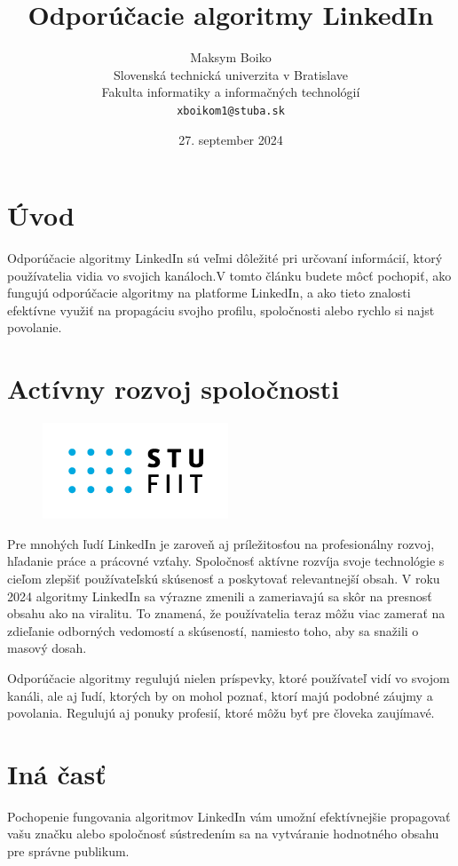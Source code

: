 \documentclass[twoside,slovak,a4paper]{coursepaper}
\title{Odporúčacie algoritmy LinkedIn\centering}
\author{Maksym Boiko\\[2pt]
{ Slovenská technická univerzita v Bratislave}\\
{ Fakulta informatiky a informačných technológií}\\
{ \texttt{xboikom1@stuba.sk}}
}
\date{\small 27. september 2024}
\begin{document}
\maketitle

\section{Úvod}
Odporúčacie algoritmy LinkedIn sú veľmi dôležité pri určovaní informácií, ktorý používatelia vidia vo svojich kanáloch.V tomto článku budete môcť pochopiť, ako fungujú odporúčacie algoritmy na platforme LinkedIn, a ako tieto znalosti efektívne využiť na propagáciu svojho profilu, spoločnosti alebo rychlo si najst povolanie.

\section{Actívny rozvoj spoločnosti} \label{rozvoj spoločnosti}

\begin{figure}
	\includegraphics{STU-FIIT-zfv.png}
\end{figure}

Pre mnohých ľudí LinkedIn je zaroveň aj príležitosťou na profesionálny rozvoj, hľadanie práce a prácovné vzťahy.
Spoločnosť aktívne rozvíja svoje technológie s cieľom zlepšiť používateľskú skúsenosť a poskytovať relevantnejší obsah. V roku 2024 algoritmy LinkedIn sa výrazne zmenili a zameriavajú sa skôr na presnosť obsahu ako na viralitu. To znamená, že používatelia teraz môžu viac zamerať na zdieľanie odborných vedomostí a skúseností, namiesto toho, aby sa snažili o masový dosah.

Odporúčacie algoritmy regulujú nielen príspevky, ktoré používateľ vidí vo svojom kanáli, ale aj ľudí, ktorých by on mohol poznať, ktorí majú podobné záujmy a povolania. Regulujú aj ponuky profesií, ktoré môžu byť pre človeka zaujímavé.~\cite{Oladipo:article}

\section{Iná časť} \label{ina}
Pochopenie fungovania algoritmov LinkedIn vám umožní efektívnejšie propagovať vašu značku alebo spoločnosť sústredením sa na vytváranie hodnotného obsahu pre správne publikum.
\end{document}
